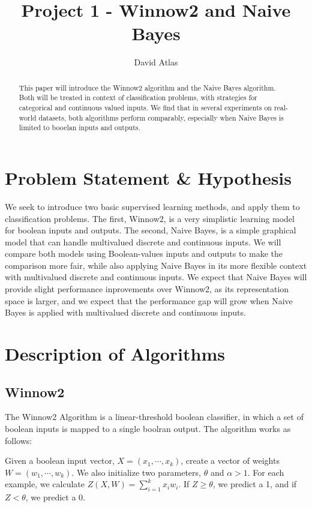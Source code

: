 \documentclass{amsart}
\title{Project 1 - Winnow2 and Naive Bayes}
\author{David Atlas}
\begin{document}
    \begin{abstract}
        This paper will introduce the Winnow2 algorithm and the Naive Bayes algorithm. Both will be treated in
        context of classification problems, with strategies for categorical and continuous valued inputs.
        We find that in several experiments on real-world datasets,
        both algorithms perform comparably, especially when Naive Bayes is
        limited to booelan inputs and outputs.
    \end{abstract}
    \maketitle
    \section{Problem Statement \& Hypothesis}
    We seek to introduce two basic supervised learning methods, and apply them to classification problems.
    The first, Winnow2, is a very simplistic learning model for boolean inputs and outputs. The second,
    Naive Bayes, is a simple graphical model that can handle multivalued discrete and continuous inputs. We will compare
    both models using Boolean-values inputs and outputs to make the comparison more fair, while also
    applying Naive Bayes in its more flexible context with multivalued discrete and continuous inputs.
    We expect that Naive Bayes will provide slight performance inprovements over Winnow2, as its representation
    space is larger, and we expect that the performance gap will grow when Naive Bayes is applied
    with multivalued discrete and continuous inputs.
    \section{Description of Algorithms}
    \subsection*{Winnow2}
    The Winnow2 Algorithm is a linear-threshold boolean classifier, in which a set of boolean inputs is mapped
    to a single boolran output. The algorithm works as follows:

    Given a boolean input vector, $X = (x_1, \cdots, x_k)$,  create a vector of weights $W = (w_1, \cdots, w_k)$.
    We also initialize two parameters, $\theta$ and $\alpha > 1$.
    For each example, we calculate $Z(X, W) = \sum_{i=1}^k x_i w_i$. If $Z \geq \theta$, we
    predict a 1, and if $Z < \theta$, we predict a 0.
\end{document}
